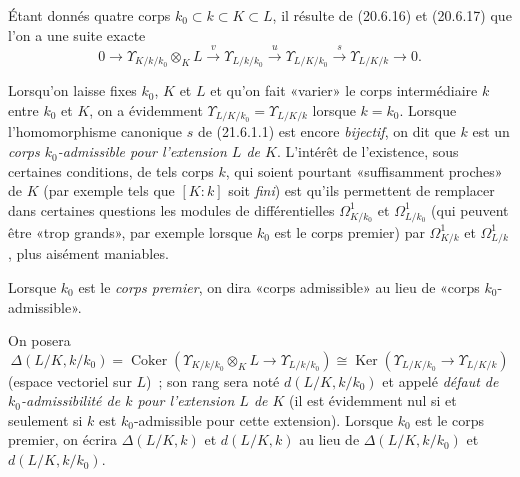 \begin{env}[21.6.1]
\label{0.21.6.1-fr}
Étant donnés quatre corps $k_0\subset k\subset K\subset L$, il résulte de
(20.6.16) et (20.6.17) que l'on a une suite exacte
\begin{equation}
\tag{21.6.1.1}
\label{0.21.6.1.1-fr}
0\to\Upsilon_{K/k/k_0}\otimes_KL\xrightarrow{v}\Upsilon_{L/k/k_0}
\xrightarrow{u}\Upsilon_{L/K/k_0}\xrightarrow{s}\Upsilon_{L/K/k}\to0.
\end{equation}

Lorsqu'on laisse fixes $k_0$, $K$ et $L$ et qu'on fait «varier» le corps
intermédiaire $k$ entre $k_0$ et $K$, on a évidemment
$\Upsilon_{L/K/k_0}=\Upsilon_{L/K/k}$ lorsque $k=k_0$. Lorsque
l'homomorphisme canonique $s$ de (21.6.1.1) est encore \emph{bijectif}, on dit que
$k$ est un \emph{corps $k_0$-admissible pour l'extension $L$ de $K$}. L'intérêt de
l'existence, sous certaines conditions, de tels corps $k$, qui soient pourtant
«suffisamment proches» de $K$ (par exemple tels que $[K:k]$ soit \emph{fini}) est
qu'ils permettent de remplacer dans certaines questions les modules de
différentielles $\Omega^1_{K/k_0}$ et $\Omega^1_{L/k_0}$ (qui peuvent être
«trop grands», par exemple lorsque $k_0$ est le corps premier) par
$\Omega^1_{K/k}$ et $\Omega^1_{L/k}$, plus aisément maniables.

Lorsque $k_0$ est le \emph{corps premier}, on dira «corps admissible» au lieu
de «corps $k_0$-admissible».
 
On posera
\begin{equation}
\label{0.21.6.1.2-fr}
\tag{21.6.1.2}
\Delta(L/K,k/k_0)=\operatorname{Coker}
(\Upsilon_{K/k/k_0}\otimes_KL\to\Upsilon_{L/k/k_0})
\cong\operatorname{Ker}(\Upsilon_{L/K/k_0}\to\Upsilon_{L/K/k})
\end{equation}
(espace vectoriel sur $L$)~; son rang sera noté $d(L/K,k/k_0)$ et appelé
\emph{défaut de $k_0$-admissibilité de $k$ pour l'extension $L$ de $K$}
(il est évidemment nul si et seulement si $k$ est $k_0$-admissible pour cette
extension). Lorsque $k_0$ est le corps premier, on écrira
$\Delta(L/K,k)$ et $d(L/K,k)$ au lieu de $\Delta(L/K,k/k_0)$ et
$d(L/K,k/k_0)$.
\end{env}

